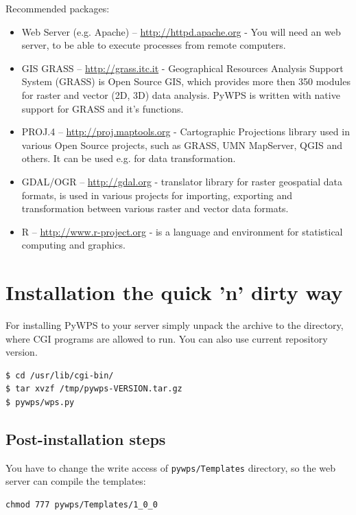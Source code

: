 \documentclass[a4paper,11pt]{report}
\begin{document}
Recommended packages:
    
\begin{itemize}
    \item Web Server (e.g. Apache) -- \url{http://httpd.apache.org} -  You
    will need an web server, to be able to execute processes from remote
    computers.

    \item GIS GRASS  -- \url{http://grass.itc.it} - Geographical Resources
    Analysis Support System (GRASS) is Open Source GIS, which provides more
    then 350 modules for raster and vector (2D, 3D) data analysis. PyWPS is
    written with native support for GRASS and it's functions.

    \item PROJ.4  -- \url{http://proj.maptools.org} - Cartographic
    Projections library used in various Open Source projects, such as
    GRASS, UMN MapServer, QGIS and others. It can be used e.g. for data
    transformation.

    \item GDAL/OGR  -- \url{http://gdal.org} - translator library for
    raster geospatial data formats, is used in various projects for
    importing, exporting and transformation between various raster and vector
    data formats.

    \item R  -- \url{http://www.r-project.org} - is a language and environment
    for statistical computing and graphics.

\end{itemize}
    
\section{Installation the quick 'n' dirty way}
For installing PyWPS to your server simply unpack the archive to the
directory, where CGI programs are allowed to run. You can also use current
repository version.

\begin{verbatim}
$ cd /usr/lib/cgi-bin/
$ tar xvzf /tmp/pywps-VERSION.tar.gz
$ pywps/wps.py
\end{verbatim}

\subsection{Post-installation steps}
You have to change the write access of \texttt{pywps/Templates} directory,
so the web server can compile the templates:
\begin{verbatim}
chmod 777 pywps/Templates/1_0_0
\end{verbatim}
\end{document}
